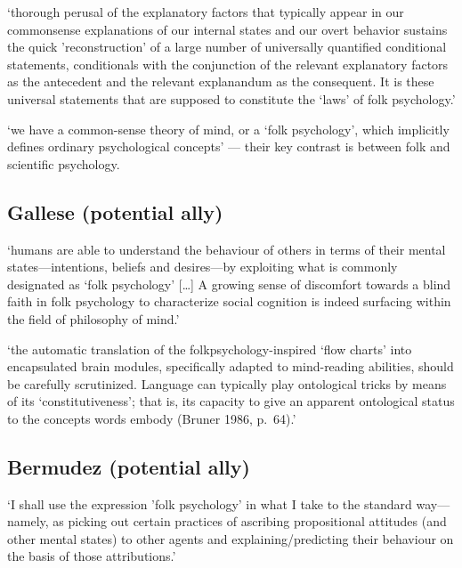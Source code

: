 \documentclass[12pt,\papersize]{extarticle}
\begin{document}
`thorough perusal of the explanatory factors that typically appear in our commonsense explanations of our internal states and our overt behavior sustains the quick 'reconstruction' of a large number of universally quantified conditional statements, conditionals with the conjunction of the relevant explanatory factors as the antecedent and the relevant explanandum as the consequent. It is these universal statements that are supposed to constitute the `laws' of folk psychology.' \citep[p.~227]{churchland:1989_folk}

`we have a common-sense theory of mind, or a `folk psychology', which implicitly defines ordinary psychological concepts' \citep[p~10]{botterill:1999_philosophy} --- their key contrast is between folk and scientific psychology.

\hypertarget{gallese-potential-ally}{%
\subsection{Gallese (potential ally)}\label{gallese-potential-ally}}

`humans are able to understand the behaviour of others in terms of their mental states---intentions, beliefs and desires---by exploiting what is commonly designated as `folk psychology' {[}\ldots{]} A growing sense of discomfort towards a blind faith in folk psychology to characterize social cognition is indeed surfacing within the field of philosophy of mind.' \citep[p.~659]{gallese:2007_theory}

`the automatic translation of the folkpsychology-inspired `flow charts' into encapsulated brain modules, specifically adapted to mind-reading abilities, should be carefully scrutinized. Language can typically play ontological tricks by means of its `constitutiveness'; that is, its capacity to give an apparent ontological status to the concepts words embody (Bruner 1986, p.~64).' \citep[p.~667]{gallese:2007_theory}

\hypertarget{bermudez-potential-ally}{%
\subsection{Bermudez (potential ally)}\label{bermudez-potential-ally}}

`I shall use the expression 'folk psychology' in what I take to the standard way---namely, as picking out certain practices of ascribing propositional attitudes (and other mental states) to other agents and explaining/predicting their behaviour on the basis of those attributions.' \citep[p.~25]{bermudez:2003_domain}
\end{document}
